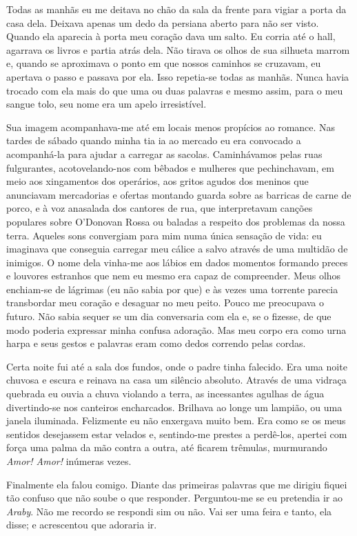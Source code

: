 Todas as manhãs eu me deitava no chão da sala da frente para vigiar a
porta da casa dela. Deixava apenas um dedo da persiana aberto para não
ser visto. Quando ela aparecia à porta meu coração dava um salto. Eu
corria até o hall, agarrava os livros e partia atrás dela. Não tirava
os olhos de sua silhueta marrom e, quando se aproximava o ponto em que
nossos caminhos se cruzavam, eu apertava o passo e passava por ela.
Isso repetia-se todas as manhãs. Nunca havia trocado com ela mais do 
que uma ou duas palavras e mesmo assim, para o meu sangue tolo, seu
nome era um apelo irresistível.

Sua imagem acompanhava-me até em locais menos propícios ao romance.
Nas tardes de sábado quando minha tia ia ao mercado eu era convocado
a acompanhá-la para ajudar a carregar as sacolas. Caminhávamos pelas
ruas fulgurantes, acotovelando-nos com bêbados e mulheres que
pechinchavam, em meio aos xingamentos dos operários, aos gritos
agudos dos meninos que anunciavam mercadorias e ofertas montando
guarda sobre as barricas de carne de porco, e à voz anasalada dos
cantores de rua, que interpretavam canções populares sobre O'Donovan
Rossa ou baladas a respeito dos problemas da nossa terra. Aqueles
sons convergiam para mim numa única sensação de vida: eu imaginava
que conseguia carregar meu cálice a salvo através de uma multidão de
inimigos. O nome dela vinha-me aos lábios em dados momentos formando
preces e louvores estranhos que nem eu mesmo era capaz de compreender.
Meus olhos enchiam-se de lágrimas (eu não sabia por que) e às vezes
uma torrente parecia transbordar meu coração e desaguar no meu peito.
Pouco me preocupava o futuro. Não sabia sequer se um dia conversaria
com ela e, se o fizesse, de que modo poderia expressar minha confusa
adoração. Mas meu corpo era como urna harpa e seus gestos e palavras
eram como dedos correndo pelas cordas.

Certa noite fui até a sala dos fundos, onde o padre tinha falecido.
Era uma noite chuvosa e escura e reinava na casa um silêncio absoluto.
Através de uma vidraça quebrada eu ouvia a chuva violando a terra, as
incessantes agulhas de água divertindo-se nos canteiros encharcados.
Brilhava ao longe um lampião, ou uma janela iluminada. Felizmente eu
não enxergava muito bem. Era como se os meus sentidos desejassem estar
velados e, sentindo-me prestes a perdê-los, apertei com força uma
palma da mão contra a outra, até ficarem trêmulas, murmurando \textit{Amor!
Amor!} inúmeras vezes.

Finalmente ela falou comigo. Diante das primeiras palavras que me
dirigiu fiquei tão confuso que não soube o que responder. Perguntou-me
se eu pretendia ir ao \textit{Araby}. Não me recordo se respondi sim ou não.
Vai ser uma feira e tanto, ela disse; e acrescentou que adoraria ir.

